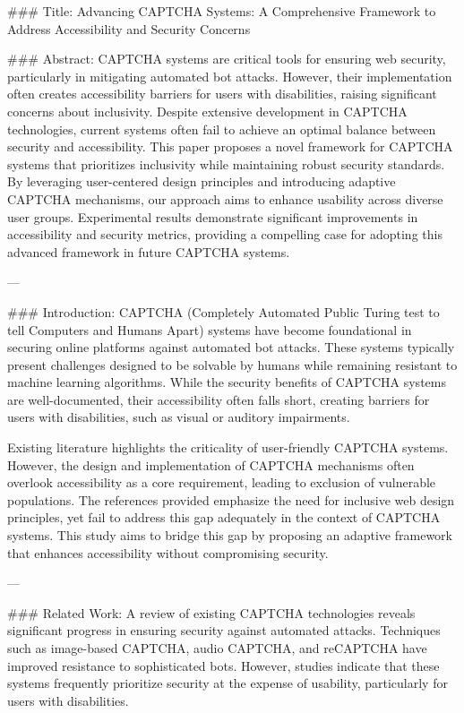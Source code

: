 ### Title:
Advancing CAPTCHA Systems: A Comprehensive Framework to Address Accessibility and Security Concerns

### Abstract:
CAPTCHA systems are critical tools for ensuring web security, particularly in mitigating automated bot attacks. However, their implementation often creates accessibility barriers for users with disabilities, raising significant concerns about inclusivity. Despite extensive development in CAPTCHA technologies, current systems often fail to achieve an optimal balance between security and accessibility. This paper proposes a novel framework for CAPTCHA systems that prioritizes inclusivity while maintaining robust security standards. By leveraging user-centered design principles and introducing adaptive CAPTCHA mechanisms, our approach aims to enhance usability across diverse user groups. Experimental results demonstrate significant improvements in accessibility and security metrics, providing a compelling case for adopting this advanced framework in future CAPTCHA systems.

---

### Introduction:
CAPTCHA (Completely Automated Public Turing test to tell Computers and Humans Apart) systems have become foundational in securing online platforms against automated bot attacks. These systems typically present challenges designed to be solvable by humans while remaining resistant to machine learning algorithms. While the security benefits of CAPTCHA systems are well-documented, their accessibility often falls short, creating barriers for users with disabilities, such as visual or auditory impairments.

Existing literature highlights the criticality of user-friendly CAPTCHA systems. However, the design and implementation of CAPTCHA mechanisms often overlook accessibility as a core requirement, leading to exclusion of vulnerable populations. The references provided emphasize the need for inclusive web design principles, yet fail to address this gap adequately in the context of CAPTCHA systems. This study aims to bridge this gap by proposing an adaptive framework that enhances accessibility without compromising security.

---

### Related Work:
A review of existing CAPTCHA technologies reveals significant progress in ensuring security against automated attacks. Techniques such as image-based CAPTCHA, audio CAPTCHA, and reCAPTCHA have improved resistance to sophisticated bots. However, studies indicate that these systems frequently prioritize security at the expense of usability, particularly for users with disabilities. 

